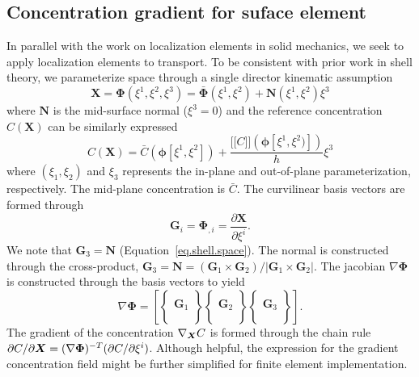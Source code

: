\documentclass[10pt]{elsarticle}
\newcommand{\mbs}[1]{\boldsymbol{#1}}
\def\ljump{\lbrack\!\lbrack}
\def\rjump{\rbrack\!\rbrack}
\def\bs{{\mbs{s}}} \def\bt{{\mbs{t}}} \def\bu{{\mbs{u}}}
\def\bPhi{{\mbs{\Phi}}}
\def\bs{\boldsymbol}
\begin{document}
\subsection{Concentration gradient for suface element}
In parallel with the work on localization elements in solid mechanics, we seek to apply localization elements to transport.  To be consistent with prior work in shell theory, we parameterize space through a single director kinematic assumption \cite{Simo1989,Fox1990}
\begin{equation}
\label{eq.shell.space} \bs{X} = \bPhi(\xi^{1},\xi^{2},\xi^{3}) =  \bar{\bs{\Phi}}(\xi^{1},\xi^{2}) + \bs{N}(\xi^{1},\xi^{2})\xi^{3}
\end{equation}
where $\bs{N}$ is the mid-surface normal ($\xi^{3} = 0$) and the reference concentration $C(\bs{X})$ can be similarly expressed
\begin{equation}
\label{eq.shell.concentration} C(\bs{X})  = \bar{C}(\bs{\phi}[\xi^{1},\xi^{2}] )+   \frac{\ljump C \rjump (\bs{\phi}[\xi^{1},\xi^{2})]) }{h} \xi^{3}
\end{equation}
where $(\xi_{1},\xi_{2})$  and $\xi_{3}$ represents the in-plane and out-of-plane parameterization, respectively. The mid-plane concentration is $\bar{C}$. The curvilinear basis vectors are formed through
\begin{equation}
\label{eq.basis.vectors} \bs{G}_{i} = \bPhi_{,i} = \frac{\partial \bs{X}}{\partial \xi^{i}}.
\end{equation}
We note that $\bs{G}_{3} = \bs{N}$ (Equation~\ref{eq.shell.space}). The normal is constructed through the cross-product, $\bs{G}_{3} = \bs{N} = (\bs{G}_{1} \times \bs{G}_{2}) / | \bs{G}_{1} \times \bs{G}_{2}|$. The jacobian $\nabla \bPhi$  is constructed through the basis vectors to yield
\begin{equation}
\label{eq.basis.jacobian}\nabla \bPhi = 
\left[ \left\{
\begin{matrix} 
 \\ 
\bs{G}_{1}  \\
 \\
 \end{matrix}
 \right\}
 \left\{
 \begin{matrix} 
 \\ 
\bs{G}_{2}  \\
 \\
 \end{matrix}
 \right\}
 \left\{
 \begin{matrix} 
 \\ 
\bs{G}_{3}  \\
 \\
 \end{matrix}
 \right\} 
\right].
\end{equation}
The gradient of the concentration $\nabla_{\bX} C$ is formed through the chain rule $\partial C / \partial \bX = (\nabla \bPhi)^{-T}(\partial C / \partial \xi^{i})$. Although helpful, the expression for the gradient concentration field might be further simplified for finite element implementation.
\end{document}
